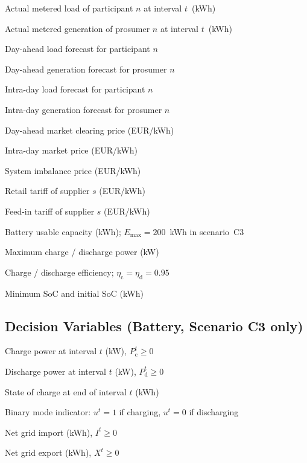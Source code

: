 \documentclass[12pt,a4paper]{article}
\begin{document}
\begin{description}[leftmargin=4em, labelwidth=3.5em]
  \item[$\ell_{n}^{t}$]   Actual metered load of participant $n$ at interval
        $t$~(kWh)
  \item[$g_{n}^{t}$]      Actual metered generation of prosumer $n$ at
        interval $t$~(kWh)
  \item[$\hat{\ell}_{n,\mathrm{DA}}^{t}$] Day-ahead load forecast for
        participant $n$
  \item[$\hat{g}_{n,\mathrm{DA}}^{t}$]   Day-ahead generation forecast for
        prosumer $n$
  \item[$\hat{\ell}_{n,\mathrm{ID}}^{t}$] Intra-day load forecast for
        participant $n$
  \item[$\hat{g}_{n,\mathrm{ID}}^{t}$]   Intra-day generation forecast for
        prosumer $n$
  \item[$\pi_{\mathrm{DA}}^{t}$] Day-ahead market clearing price
        (EUR/kWh)
  \item[$\pi_{\mathrm{ID}}^{t}$] Intra-day market price (EUR/kWh)
  \item[$\pi_{\mathrm{imb}}^{t}$] System imbalance price (EUR/kWh)
  \item[$\pi_{\mathrm{ret},s}^{t}$] Retail tariff of supplier $s$ (EUR/kWh)
  \item[$\pi_{\mathrm{fi},s}^{t}$]  Feed-in tariff of supplier $s$ (EUR/kWh)
  \item[$E_{\max}$] Battery usable capacity (kWh); $E_{\max} = 200$~kWh in
        scenario~C3
  \item[$P_{\mathrm{c}}^{\max}$, $P_{\mathrm{d}}^{\max}$] Maximum charge /
        discharge power (kW)
  \item[$\eta_{\mathrm{c}}, \eta_{\mathrm{d}}$] Charge / discharge efficiency;
        $\eta_{\mathrm{c}} = \eta_{\mathrm{d}} = 0.95$
  \item[$E_{\min}, E_{0}$] Minimum SoC and initial SoC (kWh)
\end{description}

\subsection{Decision Variables (Battery, Scenario C3 only)}

\begin{description}[leftmargin=4em, labelwidth=3.5em]
  \item[$P_{\mathrm{c}}^{t}$]  Charge power at interval $t$ (kW),
        $P_{\mathrm{c}}^{t} \geq 0$
  \item[$P_{\mathrm{d}}^{t}$]  Discharge power at interval $t$ (kW),
        $P_{\mathrm{d}}^{t} \geq 0$
  \item[$E^{t}$]               State of charge at end of interval $t$ (kWh)
  \item[$u^{t}$]               Binary mode indicator: $u^{t} = 1$ if charging,
        $u^{t} = 0$ if discharging
  \item[$I^{t}$]               Net grid import (kWh), $I^{t} \geq 0$
  \item[$X^{t}$]               Net grid export (kWh), $X^{t} \geq 0$
\end{description}
\end{document}
